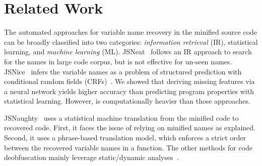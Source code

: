 \section{Related Work}
\label{related_section}

The automated approaches for variable name recovery in the minified
source code can be broadly classified into two categories: {\em
  information retrieval} (IR), statistical learning, and {\em machine
  learning} (ML).  JSNeat~\cite{icse19} follows an IR approach to search
for the names in large code corpus, but is not effective
for un-seen names.
JSNice~\cite{JSNice2015}
infers the variable names as a problem of structured prediction with
conditional random fields (CRFs)~\cite{JSNice2015}. We showed that
deriving missing features via a neural network yields higher accuracy
than predicting program properties with statistical learning. However,
{\tool} is computationally heavier than those approaches.


JSNaughty~\cite{JSNaughty2017} uses a statistical machine
translation from the minified code to recovered code. First, it
faces the issue of relying on minified names as explained.
Second, it uses a phrase-based translation model, which
enforces a strict order between the recovered variable names in a
function.
The other methods for code deobfuscation mainly leverage
static/dynamic
analyses~\cite{Christodorescu:2003:SAE:1251353.1251365,Moser:2007:EME:1263552.1264210,Udupa05deobfuscation:reverse}.


